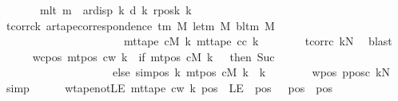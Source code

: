 \begin{isabellebody}
\ \ \ \ \ \ \ mlt{\isacharcolon}{\kern0pt}\ {\isachardoublequoteopen}m\ {\isacharless}{\kern0pt}\ ar{\isacharunderscore}{\kern0pt}disp\ {\isacharquery}{\kern0pt}k\ {\isacharparenleft}{\kern0pt}d\ k{\isacharparenright}{\kern0pt}\ {\isacharparenleft}{\kern0pt}{\isacharquery}{\kern0pt}rposk\ k{\isacharparenright}{\kern0pt}{\isachardoublequoteclose}\isanewline
\ \ \ \ \isamarkupfalse%
\ tcorr{\isacharunderscore}{\kern0pt}ck{\isacharcolon}{\kern0pt}\ {\isachardoublequoteopen}ar{\isacharunderscore}{\kern0pt}tape{\isacharunderscore}{\kern0pt}correspondence\ {\isacharparenleft}{\kern0pt}{\isasymGamma}{\isacharunderscore}{\kern0pt}tm\ M{\isacharparenright}{\kern0pt}\ {\isacharparenleft}{\kern0pt}le{\isacharunderscore}{\kern0pt}tm\ M{\isacharparenright}{\kern0pt}\ {\isacharparenleft}{\kern0pt}bl{\isacharunderscore}{\kern0pt}tm\ M{\isacharparenright}{\kern0pt}\isanewline
\ \ \ \ \ \ \ \ \ \ \ \ \ \ \ \ \ \ \ \ \ \ {\isacharparenleft}{\kern0pt}mt{\isacharunderscore}{\kern0pt}tape\ cM\ k{\isacharparenright}{\kern0pt}\ {\isacharparenleft}{\kern0pt}mt{\isacharunderscore}{\kern0pt}tape\ c{\isacharunderscore}{\kern0pt}c\ k{\isacharparenright}{\kern0pt}{\isachardoublequoteclose}\isanewline
\ \ \ \ \ \ \isamarkupfalse%
\ tcorr{\isacharunderscore}{\kern0pt}c\ kN\ \isamarkupfalse%
\ blast\isanewline
\ \ \ \ \isamarkupfalse%
\ wcpos{\isacharcolon}{\kern0pt}\ {\isachardoublequoteopen}mt{\isacharunderscore}{\kern0pt}pos\ c{\isacharunderscore}{\kern0pt}w\ k\ {\isacharequal}{\kern0pt}\ {\isacharparenleft}{\kern0pt}if\ mt{\isacharunderscore}{\kern0pt}pos\ cM\ k\ {\isacharequal}{\kern0pt}\ {}\ then\ Suc\ {}\isanewline
\ \ \ \ \ \ \ \ \ \ \ \ \ \ \ \ \ \ \ \ else\ sim{\isacharunderscore}{\kern0pt}pos\ {\isacharquery}{\kern0pt}k\ {\isacharparenleft}{\kern0pt}mt{\isacharunderscore}{\kern0pt}pos\ cM\ k{\isacharparenright}{\kern0pt}\ {\isacharplus}{\kern0pt}\ {\isacharquery}{\kern0pt}k{\isacharparenright}{\kern0pt}{\isachardoublequoteclose}\isanewline
\ \ \ \ \ \ \isamarkupfalse%
\ w{\isacharunderscore}{\kern0pt}pos\ ppos{\isacharunderscore}{\kern0pt}c\ kN\ \isamarkupfalse%
\ simp\isanewline
\ \ \ \ \isamarkupfalse%
\ wtape{\isacharunderscore}{\kern0pt}notLE{\isacharcolon}{\kern0pt}\ {\isachardoublequoteopen}mt{\isacharunderscore}{\kern0pt}tape\ c{\isacharunderscore}{\kern0pt}w\ k\ pos\ {\isasymnoteq}\ LE{}{\isachardoublequoteclose}\ \ pos{}{\isacharcolon}{\kern0pt}\ {\isachardoublequoteopen}{}\ {\isasymle}\ pos{\isachardoublequoteclose}\ \ pos\isanewline

\end{isabellebody}
